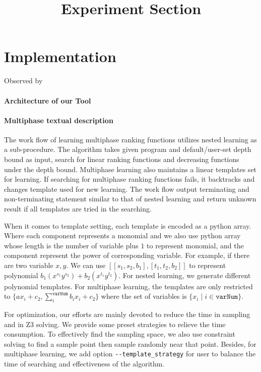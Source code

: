 \documentclass[UTF-8]{article}
\title{Experiment Section}
\begin{document}
\maketitle

\section{Implementation}
Observed by 
\paragraph{Architecture of our Tool}


\paragraph{Multiphase textual description}

The work flow of learning multiphase ranking functions utilizes nested learning as a sub-procedure. The algorithm takes given program and default/user-set depth bound as input, search for linear ranking functions and decreasing functions under the depth bound. Multiphase learning also maintains a linear templates set for learning. If searching for multiphase ranking functions fails, it backtracks and changes template used for new learning. The work flow output terminating and non-terminating statement similar to that of nested learning and return unknown result if all templates are tried in the searching.

When it comes to template setting, each template is encoded as a python array. Where each component represents a monomial and we also use python array whose length is the number of variable plus $1$ to represent monomial, and the component represent the power of corresponding variable. For example, if there are two variable $x, y$. We can use $[[s_1,s_2,b_1],[t_1,t_2,b_2]]$ to represent polynomial $b_1(x^{s_1}y^{s_2}) + b_2(x^{t_1}y^{t_2})$. For nested learning, we generate different polynomial templates. For multiphase learning, the templates are only restricted to $\{ax_i + c_2, \sum_{i}^{\texttt{varNum}}b_ix_i + c_2\}$ where the set of variables is $\{x_i\mid i\in \texttt{varNum}\}$.


For optimization, our efforts are mainly devoted to reduce the time in sampling and in Z3 solving. We provide some preset strategies to relieve the time consumption. To effectively find the sampling space, we also use constraint solving to find a sample point then sample randomly near that point. Besides, for multiphase learning, we add option \verb|--template_strategy| for user to balance the time of searching and effectiveness of the algorithm. 
\end{document}

